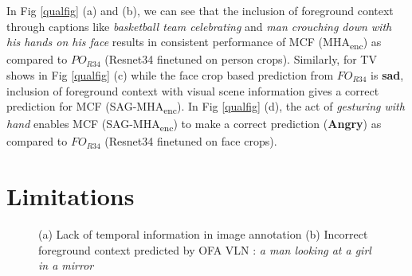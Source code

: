 In Fig \ref{qualfig} (a) and (b), we can see that the inclusion of foreground context through captions like \textit{basketball team celebrating} and \textit{man crouching down with his hands on his face} results in consistent performance of MCF (MHA\textsubscript{enc}) as compared to $PO_{R34}$ (Resnet34 finetuned on person crops).  Similarly, for TV shows in Fig \ref{qualfig} (c) while the face crop based prediction from $FO_{R34}$ is \textbf{sad}, inclusion of foreground context with visual scene information gives a correct prediction for MCF (SAG-MHA\textsubscript{enc}). In Fig \ref{qualfig} (d), the act of \textit{gesturing with hand} enables MCF (SAG-MHA\textsubscript{enc}) to make a correct prediction (\textbf{Angry}) as compared to $FO_{R34}$ (Resnet34 finetuned on face crops).

\section{Limitations}

\begin{figure}[h!]
\centering
{}
\caption{(a) Lack of temporal information in image annotation (b) Incorrect foreground context predicted by OFA VLN \cite{wang2022ofa}: \textit{a man looking at a girl in a mirror}}
\label{temporal information and incorrect foreground}
\end{figure}

